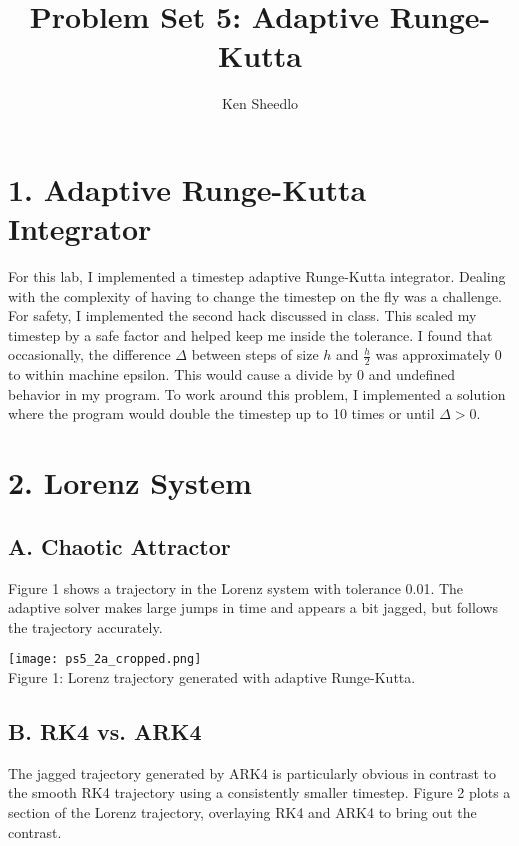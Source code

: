\documentclass[12pt, letterpaper]{article}
\title{Problem Set 5: Adaptive Runge-Kutta}
\author{Ken Sheedlo}
\begin{document}
\maketitle{}

\section*{1. Adaptive Runge-Kutta Integrator}

For this lab, I implemented a timestep adaptive Runge-Kutta integrator. Dealing
with the complexity of having to change the timestep on the fly was a challenge.
For safety, I implemented the second hack discussed in class. This scaled my 
timestep by a safe factor and helped keep me inside the tolerance. I found that
occasionally, the difference $\Delta$ between steps of size $h$ and $\frac{h}{2}$
was approximately 0 to within machine epsilon. This would cause a divide by 0 
and undefined behavior in my program. To work around this problem, I implemented
a solution where the program would double the timestep up to 10 times or until 
$\Delta > 0$.

\section*{2. Lorenz System}
\subsection*{A. Chaotic Attractor}

Figure 1 shows a trajectory in the Lorenz system with tolerance 0.01. The 
adaptive solver makes large jumps in time and appears a bit jagged, but follows
the trajectory accurately.

\newpage
\begin{center}
\texttt{[image: ps5\_2a\_cropped.png]}
\\
Figure 1: Lorenz trajectory generated with adaptive Runge-Kutta.
\end{center}

\subsection*{B. RK4 vs. ARK4}

The jagged trajectory generated by ARK4 is particularly obvious in contrast to 
the smooth RK4 trajectory using a consistently smaller timestep. Figure 2 plots
a section of the Lorenz trajectory, overlaying RK4 and ARK4 to bring out the 
contrast.
\end{document}
